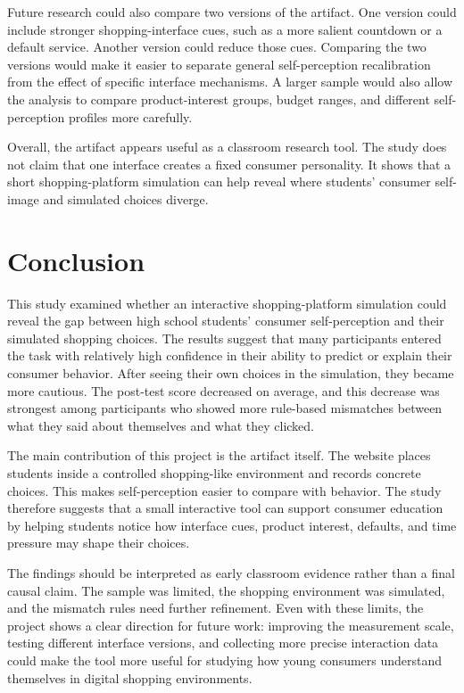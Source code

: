 \documentclass[stu,12pt,floatsintext]{apa7}
\begin{document}
Future research could also compare two versions of the artifact. One version could include stronger shopping-interface cues, such as a more salient countdown or a default service. Another version could reduce those cues. Comparing the two versions would make it easier to separate general self-perception recalibration from the effect of specific interface mechanisms. A larger sample would also allow the analysis to compare product-interest groups, budget ranges, and different self-perception profiles more carefully.

Overall, the artifact appears useful as a classroom research tool. The study does not claim that one interface creates a fixed consumer personality. It shows that a short shopping-platform simulation can help reveal where students' consumer self-image and simulated choices diverge.

\section{Conclusion}

This study examined whether an interactive shopping-platform simulation could reveal the gap between high school students' consumer self-perception and their simulated shopping choices. The results suggest that many participants entered the task with relatively high confidence in their ability to predict or explain their consumer behavior. After seeing their own choices in the simulation, they became more cautious. The post-test score decreased on average, and this decrease was strongest among participants who showed more rule-based mismatches between what they said about themselves and what they clicked.

The main contribution of this project is the artifact itself. The website places students inside a controlled shopping-like environment and records concrete choices. This makes self-perception easier to compare with behavior. The study therefore suggests that a small interactive tool can support consumer education by helping students notice how interface cues, product interest, defaults, and time pressure may shape their choices.

The findings should be interpreted as early classroom evidence rather than a final causal claim. The sample was limited, the shopping environment was simulated, and the mismatch rules need further refinement. Even with these limits, the project shows a clear direction for future work: improving the measurement scale, testing different interface versions, and collecting more precise interaction data could make the tool more useful for studying how young consumers understand themselves in digital shopping environments.
\end{document}
